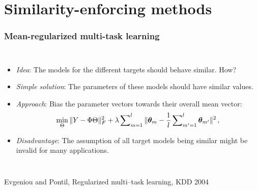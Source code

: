 \documentclass[11pt,compress,t,notes=noshow, xcolor=table]{beamer}
\begin{document}
\section{Similarity-enforcing methods}

\begin{frame}[t]
	\frametitle{Mean-regularized multi-task learning}
	
	\vspace{0.2cm}
	\begin{columns}
		\column{5cm}
		\footnotesize{
			\begin{itemize} 
%				
				\item \emph{Idea}: The models for the different targets should behave similar. How?
%				
				\item \emph{Simple solution}: The parameters of these models should have similar values.
%				
				\item \emph{Approach}: Bias the parameter vectors towards their overall mean vector:
					\vspace{0.2cm}
				\begin{equation*}
					\label{eq:meanreg}
					\min_\Theta \|Y - \Phi \Theta \|^2_F + \lambda \sum\nolimits_{m=1}^l \|\bm{\theta}_m - \frac{1}{l} \sum\nolimits_{m'=1}^l \bm{\theta}_{m'} \|^2 \, ,
				\end{equation*}
%				
				\item \emph{Disadvantage}: The assumption of all target models being similar might be invalid for many applications. \lz
			\end{itemize}
		}
		\column{4.5cm}
		
%	
	\end{columns}

{\tiny Evgeniou and Pontil, Regularized multi--task learning, KDD 2004}
\end{frame}
\end{document}
